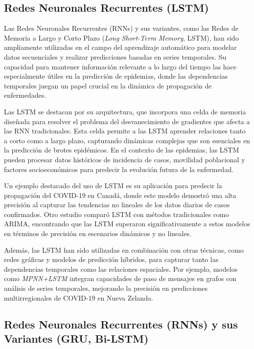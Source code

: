 \subsection{Redes Neuronales Recurrentes (LSTM)}

Las Redes Neuronales Recurrentes (RNNs) y sus variantes, como las Redes de Memoria a Largo y Corto Plazo (\textit{Long Short-Term Memory}, LSTM), han sido ampliamente utilizadas en el campo del aprendizaje automático para modelar datos secuenciales y realizar predicciones basadas en series temporales. Su capacidad para mantener información relevante a lo largo del tiempo las hace especialmente útiles en la predicción de epidemias, donde las dependencias temporales juegan un papel crucial en la dinámica de propagación de enfermedades\parencite{Shah2024COVID19FU}.

Las LSTM se destacan por su arquitectura, que incorpora una celda de memoria diseñada para resolver el problema del desvanecimiento de gradientes que afecta a las RNN tradicionales\parencite{Santangelo2023MachineLearning}. Esta celda permite a las LSTM aprender relaciones tanto a corto como a largo plazo, capturando dinámicas complejas que son esenciales en la predicción de brotes epidémicos. En el contexto de las epidemias, las LSTM pueden procesar datos históricos de incidencia de casos, movilidad poblacional y factores socioeconómicos para predecir la evolución futura de la enfermedad\parencite{Nguyen2023NZSTGNN}.

Un ejemplo destacado del uso de LSTM es su aplicación para predecir la propagación del COVID-19 en Canadá, donde este modelo demostró una alta precisión al capturar las tendencias no lineales de los datos diarios de casos confirmados\parencite{Shah2024COVID19FU}. Otro estudio comparó LSTM con métodos tradicionales como ARIMA, encontrando que las LSTM superaron significativamente a estos modelos en términos de precisión en escenarios dinámicos y no lineales\parencite{Nguyen2023NZSTGNN, Baccega2024Sybil}. 

Además, las LSTM han sido utilizadas en combinación con otras técnicas, como redes gráficas y modelos de predicción híbridos, para capturar tanto las dependencias temporales como las relaciones espaciales. Por ejemplo, modelos como \textit{MPNN+LSTM} integran capacidades de paso de mensajes en grafos con análisis de series temporales, mejorando la precisión en predicciones multirregionales de COVID-19 en Nueva Zelanda\parencite{Nguyen2023NZSTGNN}.

\subsection{Redes Neuronales Recurrentes (RNNs) y sus Variantes (GRU, Bi-LSTM)}

